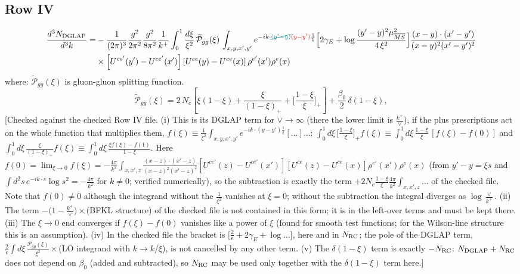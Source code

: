 \documentclass[9pt]{article}
\numberwithin{equation}{section}
\begin{document}
\subsection{Row IV}
\begin{align}
\frac{d^{3}N_{\rm DGLAP}}{d^{3}k}= &-\frac{1}{(2\pi)^{3}}\frac{g^{2}}{2\pi^{2}}\frac{g^{2}}{8\pi^{2}}\frac{1}{k^{+}}\int_{0}^{1}\frac{d\xi}{\xi^{2}}\,\widetilde{\mathcal P}_{gg}(\xi)\,\int_{x,y,x',y'}e^{-ik\cdot{\color{teal}\cancel{(y'-y)}}{\color{red}(y-y')}\frac{1}{\xi}}\Big[2\gamma_{E}+\log\frac{(y'-y)^{2}\mu^{2}_{\overline{MS}}}{4\,\xi^{2}}\Big]\frac{(x-y)\cdot(x'-y')}{(x-y)^{2}(x'-y')^{2}}\notag\\
&\times\left[U^{ce'}(y') - U^{ce'}(x')\right]\left[U^{ce}(y) - U^{ce}(x)\right]\rho^{e'}(x')\rho^{e}(x)
\end{align}
where:
$\widetilde{\mathcal{P}}_{gg}(\xi)$ is gluon-gluon splitting function.
$$\widetilde{\mathcal{P}}_{gg}(\xi) = 2\,N_{c}\left[\xi(1-\xi) + \frac{\xi}{(1-\xi)_{+}} + \Big[\frac{1-\xi}{\xi}\Big]_{+}\right]+\frac{\beta_{0}}{2}\,\delta(1-\xi),$$ {\color{red}[Checked against the checked Row IV file. (i) This is its DGLAP term for $\vee\to\infty$ (there the lower limit is $\frac{k^{+}}{\vee}$), if the plus prescriptions act on the whole function that multiplies them, $f(\xi)\equiv\frac{1}{\xi^{2}}\int_{x,y,x',y'}e^{-ik\cdot(y-y')\frac{1}{\xi}}[\dots]\dots$: $\int_{0}^{1}d\xi\,\big[\frac{1-\xi}{\xi}\big]_{+}f(\xi)\equiv\int_{0}^{1}d\xi\,\frac{1-\xi}{\xi}\,[f(\xi)-f(0)]$ and $\int_{0}^{1}d\xi\,\frac{\xi}{(1-\xi)_{+}}f(\xi)\equiv\int_{0}^{1}d\xi\,\frac{\xi f(\xi)-f(1)}{1-\xi}$. Here $f(0)=\lim_{\xi\to0}f(\xi)=-\frac{4\pi}{k^{2}}\int_{x,x',z}\frac{(x-z)\cdot(x'-z)}{(x-z)^{2}(x'-z)^{2}}[U^{ce'}(z)-U^{ce'}(x')][U^{ce}(z)-U^{ce}(x)]\rho^{e'}(x')\rho^{e}(x)$ (from $y'-y=\xi s$ and $\int d^{2}s\,e^{-ik\cdot s}\log s^{2}=-\frac{4\pi}{k^{2}}$ for $k\neq0$; verified numerically), so the subtraction is exactly the term $+2N_{c}\frac{1-\xi}{\xi}\frac{4\pi}{k^{2}}\int_{x,x',z}\dots$ of the checked file. Note that $f(0)\neq0$ although the integrand without the $\frac{1}{\xi^{2}}$ vanishes at $\xi=0$; without the subtraction the integral diverges as $\log\frac{\vee}{k^{+}}$. (ii) The term $-\big(1-\frac{k^{+}}{\vee}\big)\times$(BFKL structure) of the checked file is not contained in this form; it is in the left-over terms and must be kept there. (iii) The $\xi\to0$ end converges if $f(\xi)-f(0)$ vanishes like a power of $\xi$ (found for smooth test functions; for the Wilson-line structure this is an assumption). (iv) In the checked file the bracket is $\big[\frac{2}{\epsilon}+2\gamma_{E}+\log\dots\big]$, here and in $N_{\rm RC}$; the pole of the DGLAP term, $\frac{2}{\epsilon}\int d\xi\,\frac{\mathcal P_{gg}(\xi)}{\xi^{2}}\times$(LO integrand with $k\to k/\xi$), is not cancelled by any other term. (v) The $\delta(1-\xi)$ term is exactly $-N_{\rm RC}$: $N_{\rm DGLAP}+N_{\rm RC}$ does not depend on $\beta_{0}$ (added and subtracted), so $N_{\rm RC}$ may be used only together with the $\delta(1-\xi)$ term here.]}\par\noindent
\end{document}
